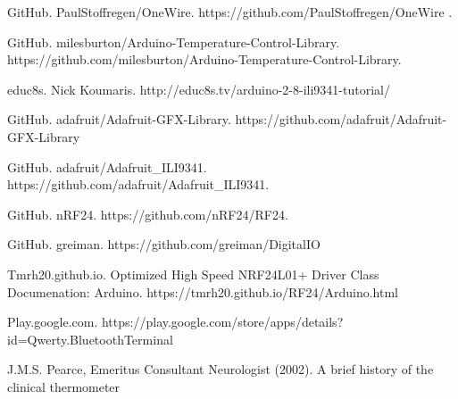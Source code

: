 \begin{thebibliography}{9}
GitHub. PaulStoffregen/OneWire. https://github.com/PaulStoffregen/OneWire .

GitHub. milesburton/Arduino-Temperature-Control-Library. https://github.com/milesburton/Arduino-Temperature-Control-Library.

educ8s. Nick Koumaris.
http://educ8s.tv/arduino-2-8-ili9341-tutorial/

GitHub. adafruit/Adafruit-GFX-Library.  https://github.com/adafruit/Adafruit-GFX-Library

GitHub. adafruit/Adafruit\_ILI9341. https://github.com/adafruit/Adafruit\_ILI9341.

GitHub. nRF24. https://github.com/nRF24/RF24.

GitHub. greiman. https://github.com/greiman/DigitalIO

Tmrh20.github.io. Optimized High Speed NRF24L01+ Driver Class Documenation: Arduino. https://tmrh20.github.io/RF24/Arduino.html

Play.google.com. https://play.google.com/store/apps/details?id=Qwerty.BluetoothTerminal

J.M.S. Pearce, 
Emeritus Consultant Neurologist (2002). A brief history of the clinical thermometer

\end{thebibliography}